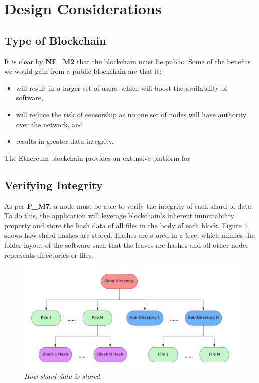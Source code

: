 
\section{Design Considerations}

\subsection*{Type of Blockchain}

It is clear by \textbf{NF\_M2} that the blockchain must be public. Some of the benefits we would gain from a public blockchain are that it:

\begin{itemize}
  \item will result in a larger set of users, which will boost the availability of software,
  \item will reduce the risk of censorship as no one set of nodes will have authority over the network, and
  \item results in greater data integrity.
\end{itemize}

The Ethereum blockchain provides an extensive platform for 

\subsection*{Verifying Integrity}

As per \textbf{F\_M7}, a node must be able to verify the integrity of each shard of data. To do this, the application will leverage blockchain's inherent immutability property and store the hash data of all files in the body of each block.
\x
Figure~\ref{fig:hash-storage} shows how shard hashes are stored. Hashes are stored in a tree, which mimics the folder layout of the software such that the leaves are hashes and all other nodes represents directories or files. 

\begin{figure}[ht]
  \centering
  \includegraphics[width=.85\textwidth]{diagrams/block-body.png}
  \caption{\textit{How shard data is stored.}}
  \label{fig:hash-storage}
\end{figure}

